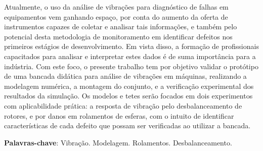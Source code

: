 \imprimircapa
\imprimirfolhaderosto
\clearpage


%	

\begin{resumo}
	\SingleSpacing
	Atualmente, o uso da análise de vibrações para diagnóstico de falhas em equipamentos vem ganhando espaço, por conta do aumento da oferta de instrumentos capazes de coletar e analisar tais informações, e também pelo potencial desta metodologia de monitoramento em identificar defeitos nos primeiros estágios de desenvolvimento. Em vista disso, a formação de profissionais capacitados para analisar e interpretar estes dados é de suma importância para a indústria. Com este foco, o presente trabalho tem por objetivo validar o protótipo de uma bancada didática para análise de vibrações em máquinas, realizando a modelagem numérica, a montagem do conjunto, e a verificação experimental dos resultados da simulação. Os modelos e tetes serão focados em dois experimentos com aplicabilidade prática: a resposta de vibração pelo desbalanceamento de rotores, e por danos em rolamentos de esferas, com o intuito de identificar características de cada defeito que possam ser verificadas ao utilizar a bancada.
	\vspace{\onelineskip}
	
	\noindent
	\textbf{Palavras-chave}: Vibração. Modelagem. Rolamentos. Desbalanceamento.
\end{resumo}

%		

